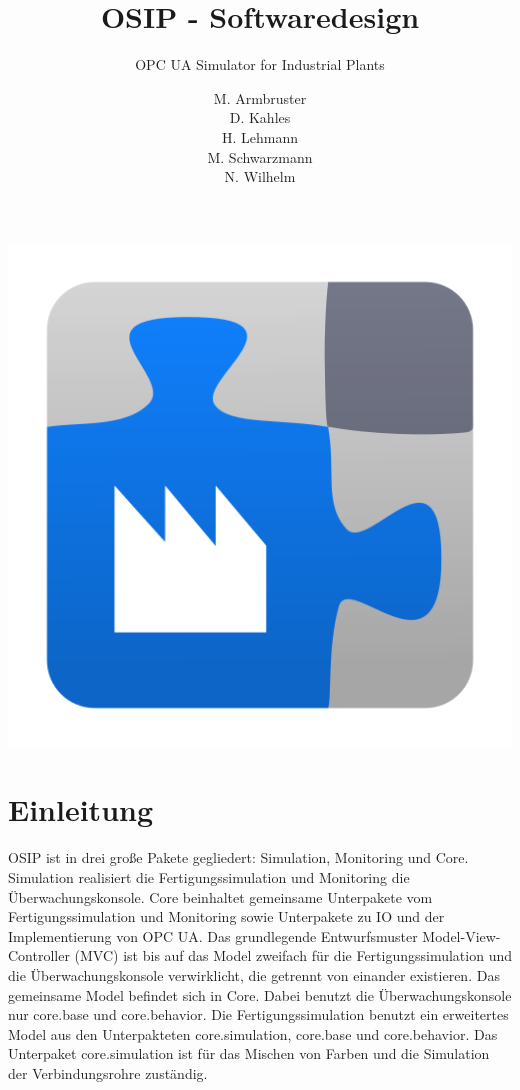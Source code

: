 \documentclass[parskip=full]{scrartcl}
\title{OSIP - Softwaredesign}
\subtitle{OPC UA Simulator for Industrial Plants}
\author{
    M. Armbruster\\
    D. Kahles\\
    H. Lehmann\\
    M. Schwarzmann\\
    N. Wilhelm
}
\begin{document}
\maketitle

\vspace{20px}
\begin{center}
  \includegraphics[scale=0.4]{../icon.png}
\end{center}
\pagebreak
\tableofcontents
\pagebreak

\section{Einleitung}
OSIP ist in drei große Pakete gegliedert: Simulation, Monitoring und Core.
Simulation realisiert die Fertigungssimulation und Monitoring die Überwachungskonsole.
Core beinhaltet gemeinsame Unterpakete vom Fertigungssimulation und Monitoring sowie Unterpakete zu IO und der Implementierung
von OPC UA.
Das grundlegende Entwurfsmuster Model-View-Controller (MVC) ist bis auf das Model zweifach für die Fertigungssimulation und die Überwachungskonsole verwirklicht, die getrennt von einander existieren.
Das gemeinsame Model befindet sich in Core. Dabei benutzt die Überwachungskonsole nur core.base und core.behavior.
Die Fertigungssimulation benutzt ein erweitertes Model aus den Unterpakteten core.simulation, core.base und core.behavior.
Das Unterpaket core.simulation ist für das Mischen von Farben und die Simulation der Verbindungsrohre zuständig.
\end{document}
